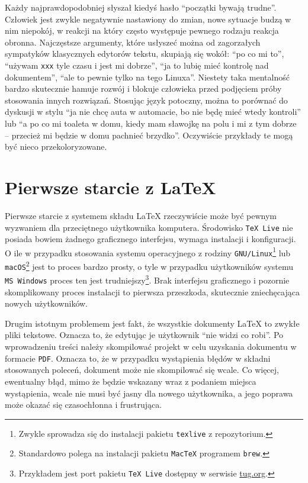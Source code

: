 Każdy najprawdopodobniej słyszał kiedyś hasło \enquote{początki bywają trudne}. Człowiek jest zwykle negatywnie nastawiony do zmian, nowe sytuacje budzą w nim niepokój, w reakcji na który często występuje pewnego rodzaju reakcja obronna. Najczęstsze argumenty, które usłyszeć można od zagorzałych sympatyków klasycznych edytorów tekstu, skupiają się wokół: \enquote{po co mi to}, \enquote{używam \texttt{xxx} tyle czasu i jest mi dobrze}, \enquote{ja to lubię mieć kontrolę nad dokumentem}, \enquote{ale to pewnie tylko na tego Linuxa}. Niestety taka mentalność bardzo skutecznie hamuje rozwój i blokuje człowieka przed podjęciem próby stosowania innych rozwiązań. Stosując język potoczny, można to porównać do dyskusji w stylu \enquote{ja nie chcę auta w automacie, bo nie będę mieć wtedy kontroli} lub \enquote{a po co mi toaleta w domu, kiedy mam sławojkę na polu i mi z tym dobrze -- przecież mi będzie w domu pachnieć brzydko}. Oczywiście przykłady te mogą być nieco przekoloryzowane.

\section{Pierwsze starcie z \LaTeX}

Pierwsze starcie z systemem składu \LaTeX{} rzeczywiście może być pewnym wyzwaniem dla przeciętnego użytkownika komputera. Środowisko \texttt{TeX Live} nie posiada bowiem żadnego graficznego interfejsu, wymaga instalacji i konfiguracji. O ile w przypadku stosowania systemu operacyjnego z rodziny \texttt{GNU/Linux}\footnote{Zwykle sprowadza się do instalacji pakietu \texttt{texlive} z repozytorium.} lub \texttt{macOS}\footnote{Standardowo polega na instalacji pakietu \texttt{MacTeX} programem \texttt{brew}.} jest to proces bardzo prosty, o tyle w przypadku użytkowników systemu \texttt{MS Windows} proces ten jest trudniejszy\footnote{Przykładem jest port pakietu \texttt{TeX Live} dostępny w serwisie \href{https://tug.org/texlive/windows.html}{tug.org}.}. Brak interfejsu graficznego i pozornie skomplikowany proces instalacji to pierwsza przeszkoda, skutecznie zniechęcająca nowych użytkowników.

Drugim istotnym problemem jest fakt, że wszystkie dokumenty \LaTeX{} to zwykłe pliki tekstowe. Oznacza to, że edytując je użytkownik \enquote{nie widzi co robi}. Po wprowadzeniu treści należy skompilować projekt w celu uzyskania dokumentu w formacie \texttt{PDF}. Oznacza to, że w przypadku wystąpienia błędów w składni stosowanych poleceń, dokument może nie skompilować się wcale. Co więcej, ewentualny błąd, mimo że będzie wskazany wraz z podaniem miejsca wystąpienia, wcale nie musi być jasny dla nowego użytkownika, a jego poprawa może okazać się czasochłonna i frustrująca.

